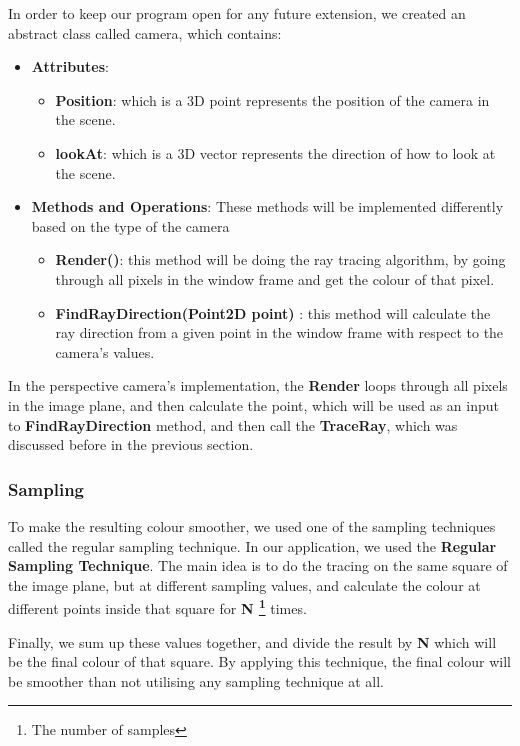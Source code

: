 \documentclass[a4paper]{report}
\begin{document}
	In order to keep our program open for any future extension, we created an abstract class called camera, which contains:
	\begin{itemize}
		\item \textbf{Attributes}:
		\begin{itemize} 
			\item \textbf{Position}: which is a 3D point represents the position of the camera in the scene.
			\item \textbf{lookAt}: which is a 3D vector represents the direction of how to look at the scene.
		\end{itemize}
		\item \textbf{Methods and Operations}: These methods will be implemented differently based on the type of the camera
		\begin{itemize} 
			\item \textbf{Render()}: this method will be doing the ray tracing algorithm, by going through all pixels in the window frame and get the colour of that pixel.
			\item \textbf{FindRayDirection(Point2D point)} : this method will calculate the ray direction from a given point in the window frame with respect to the camera's values.
		\end{itemize}
	\end{itemize}
	\par In the perspective camera's implementation, the \textbf{Render} loops through all pixels in the image plane,  and then calculate the point, which will be used as an input to \textbf{FindRayDirection} method, and then call the \textbf{TraceRay}, which was discussed before in the previous section. 
	\subsubsection{Sampling}
	To make the resulting colour smoother, we used one of the sampling techniques called the regular sampling technique. In our application, we used the \textbf{Regular Sampling Technique}. The main idea is to do the tracing on the same square of the image plane, but at different sampling values, and calculate the colour at different points inside that square for \textbf{N \footnote{The number of samples}} times.\newline
	\par Finally, we sum up these values together, and divide the result by \textbf{N} which will be the final colour of that square. By applying this technique, the final colour will be smoother than not utilising any sampling technique at all.
\end{document}
